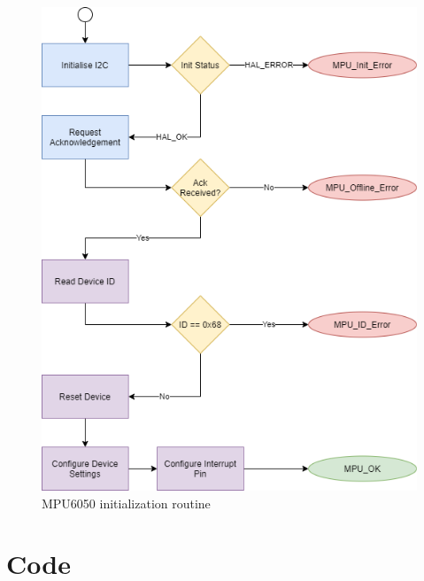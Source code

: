 \begin{figure}[H]
    \centering
    \includegraphics[scale=0.3]{MPU Init Diagram.png}
    \caption{MPU6050 initialization routine}
    \label{fig:Init_diagram_mpu}
\end{figure}

\section{Code}

